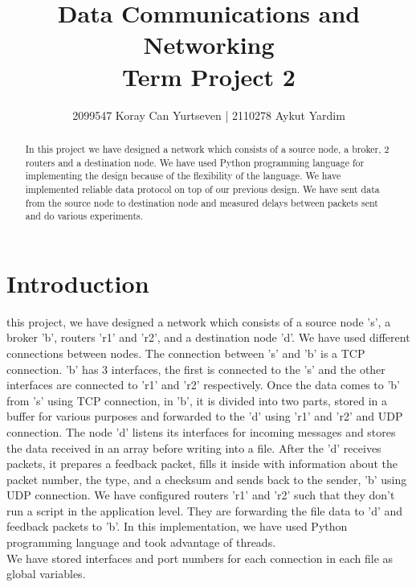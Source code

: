 \documentclass[12pt,journal,compsoc]{IEEEtran}
\begin{document}
\title{Data Communications and Networking \\ Term Project 2}


\author{2099547 Koray Can Yurtseven | 2110278 Aykut Yardim}

\maketitle



\begin{abstract}
In this project we have designed a network which consists of a source node, a broker, 2 routers and a destination node. We have used Python programming language for implementing the design because of the flexibility of the language. We have implemented reliable data protocol on top of our previous design. We have sent data from the source node to destination node and measured delays between packets sent and do various experiments.
\end{abstract}

\section{Introduction}

 this project, we have designed a network which consists of a source node 's', a broker 'b', routers 'r1' and 'r2', and a destination node 'd'. We have used different connections between nodes. The connection between 's' and 'b' is a TCP connection. 'b' has 3 interfaces, the first is connected to the 's' and the other interfaces are connected to 'r1' and 'r2' respectively. Once the data comes to 'b' from 's' using TCP connection, in 'b', it is divided into two parts, stored in a buffer for various purposes and forwarded to the 'd' using 'r1' and 'r2' and UDP connection. The node 'd' listens its interfaces for incoming messages and stores the data received in an array before writing into a file. After the 'd' receives packets, it prepares a feedback packet, fills it inside with information about the packet number, the type, and a checksum and sends back to the sender, 'b' using UDP connection. We have configured routers 'r1' and 'r2' such that they don't run a script in the application level. They are forwarding the file data to 'd' and feedback packets to 'b'.
In this implementation, we have used Python programming language and took advantage of threads.\\
We have stored interfaces and port numbers for each connection in each file as global variables.\\
\end{document}
